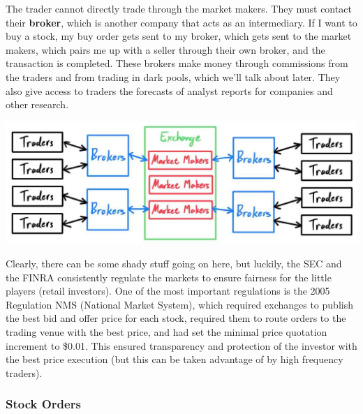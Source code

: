 \documentclass{article}
\begin{document}
The trader cannot directly trade through the market makers. They must contact their \textbf{broker}, which is another company that acts as an intermediary. If I want to buy a stock, my buy order gets sent to my broker, which gets sent to the market makers, which pairs me up with a seller through their own broker, and the transaction is completed. These brokers make money through commissions from the traders and from trading in dark pools, which we'll talk about later. They also give access to traders the forecasts of analyst reports for companies and other research. 

\begin{center}
    \includegraphics[scale=0.3]{img/exchange.jpg}
\end{center}

Clearly, there can be some shady stuff going on here, but luckily, the SEC and the FINRA consistently regulate the markets to ensure fairness for the little players (retail investors). One of the most important regulations is the 2005 Regulation NMS (National Market System), which required exchanges to publish the best bid and offer price for each stock, required them to route orders to the trading venue with the best price, and had set the minimal price quotation increment to \$0.01. This ensured transparency and protection of the investor with the best price execution (but this can be taken advantage of by high frequency traders). 


\subsubsection{Stock Orders}
\end{document}

